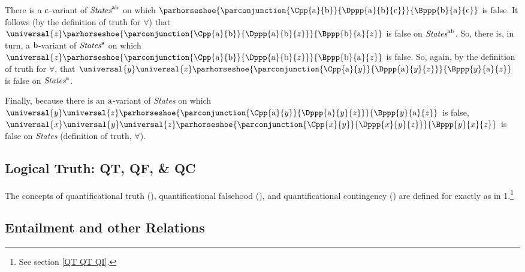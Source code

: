\begin{PROOF}
	There is a $\mathrm{c}$-variant of $\emph{States}^{\mathrm{a}\mathrm{b}}$ on which $\parhorseshoe{\parconjunction{\Cpp{\constant{a}}{\constant{b}}}{\Dppp{\constant{a}}{\constant{b}}{\constant{c}}}}{\Bppp{\constant{b}}{\constant{a}}{\constant{c}}}$ is false.  It follows (by the definition of truth for $\forall$) that $\universal{\variable{z}}\parhorseshoe{\parconjunction{\Cpp{\constant{a}}{\constant{b}}}{\Dppp{\constant{a}}{\constant{b}}{\variable{z}}}}{\Bppp{\constant{b}}{\constant{a}}{\variable{z}}}$ is false on $\emph{States}^{\mathrm{a}\mathrm{b}}$.  So, there is, in turn, a $\mathrm{b}$-variant of $\emph{States}^{\mathrm{a}}$ on which $\universal{\variable{z}}\parhorseshoe{\parconjunction{\Cpp{\constant{a}}{\constant{b}}}{\Dppp{\constant{a}}{\constant{b}}{\variable{z}}}}{\Bppp{\constant{b}}{\constant{a}}{\variable{z}}}$ is false.  So, again, by the definition of truth for $\forall$, that $\universal{\variable{y}}\universal{\variable{z}}\parhorseshoe{\parconjunction{\Cpp{\constant{a}}{\variable{y}}}{\Dppp{\constant{a}}{\variable{y}}{\variable{z}}}}{\Bppp{\variable{y}}{\constant{a}}{\variable{z}}}$ is false on $\emph{States}^{\mathrm{a}}$.
	
	Finally, because there is an $\mathrm{a}$-variant of \emph{States} on which $\universal{\variable{y}}\universal{\variable{z}}\parhorseshoe{\parconjunction{\Cpp{\constant{a}}{\variable{y}}}{\Dppp{\constant{a}}{\variable{y}}{\variable{z}}}}{\Bppp{\variable{y}}{\constant{a}}{\variable{z}}}$ is false, $\universal{\variable{x}}\universal{\variable{y}}\universal{\variable{z}}\parhorseshoe{\parconjunction{\Cpp{\variable{x}}{\variable{y}}}{\Dppp{\variable{x}}{\variable{y}}{\variable{z}}}}{\Bppp{\variable{y}}{\variable{x}}{\variable{z}}}$ is false on \emph{States} (definition of truth, $\forall$).
\end{PROOF}

\subsection{Logical Truth: QT, QF, \& QC}\label{QT QF QI GQL}
The concepts of quantificational truth (), quantificational falsehood (), and quantificational contingency () are defined for \GQL{} exactly as in \GQL{}1.\footnote{See section \vref{QT QT QI}.} 

\subsection{Entailment and other Relations}\label{GQL Entailment and other Relations}


